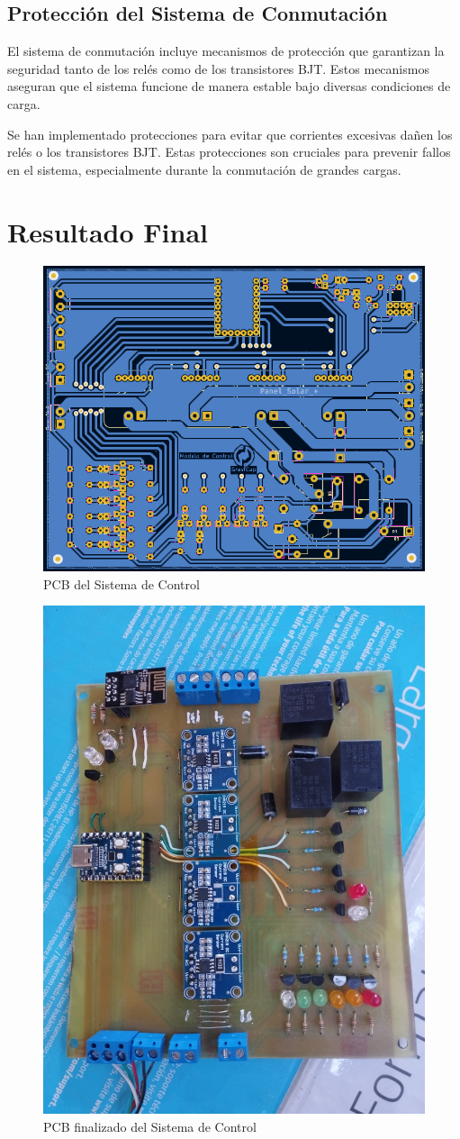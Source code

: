             \subsection{Protección del Sistema de Conmutación}
                El sistema de conmutación incluye mecanismos de protección que garantizan la seguridad tanto de los relés como de los transistores BJT. Estos mecanismos aseguran que el sistema funcione de manera estable bajo diversas condiciones de carga.\par
                Se han implementado protecciones para evitar que corrientes excesivas dañen los relés o los transistores BJT. Estas protecciones son cruciales para prevenir fallos en el sistema, especialmente durante la conmutación de grandes cargas.\par
            
        \section{Resultado Final}
            \begin{figure}[H]
                    \centering
                    \includegraphics[width=0.8\linewidth]{Imagenes/Hardware/PCB.jpg}
                    \caption{PCB del Sistema de Control}
                    \label{fig:h1}
                \end{figure}

            \begin{figure}
                \centering
                \includegraphics[width=0.5\linewidth]{Imagenes/Hardware/Finished.jpg}
                \caption{PCB finalizado del Sistema de Control}
                \label{fig:h2}
            \end{figure}